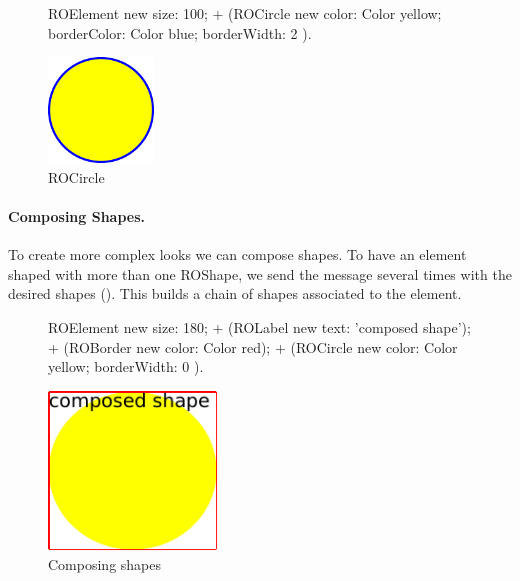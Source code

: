 \documentclass[a4paper,10pt,twoside]{book}
\begin{document}
\begin{figure}[H]
      \begin{minipage}[t]{0.5\textwidth}
      \vspace{0pt}
     \begin{code}
     
ROElement new 
	size: 100; 
	+ (ROCircle new 
				color: Color yellow; 
				borderColor: Color blue; 
				borderWidth: 2 ).	\end{code}
   \end{minipage}
   \hfill
   \begin{minipage}[t]{0.4\textwidth}
      \vspace{0pt} \raggedright
       \centering
		\includegraphics[width=0.25\textwidth]{circle}     
   \end{minipage}
\caption{ROCircle}
\label{fig:circle}
\end{figure}



\paragraph{Composing Shapes.}
To create more complex looks we can compose shapes. To have an element shaped with more than one ROShape, we send the \ct{+} message several times with the desired shapes (). This builds a chain of shapes associated to the element.
\begin{figure}[H]
      \begin{minipage}[t]{0.5\textwidth}
      \vspace{0pt}
     \begin{code}
     
ROElement new 
	size: 180;  
	+ (ROLabel new text: 'composed shape');
	+ (ROBorder new color: Color red); 
	+ (ROCircle new color: Color yellow; 
					borderWidth: 0 ).	\end{code}
   \end{minipage}
   \hfill
   \begin{minipage}[t]{0.4\textwidth}
      \vspace{0pt} \raggedright
       \centering
		\includegraphics[width=0.4\textwidth]{composed}
   \end{minipage}
\caption{Composing shapes}
\label{fig:composed}
\end{figure} 
\end{document}
